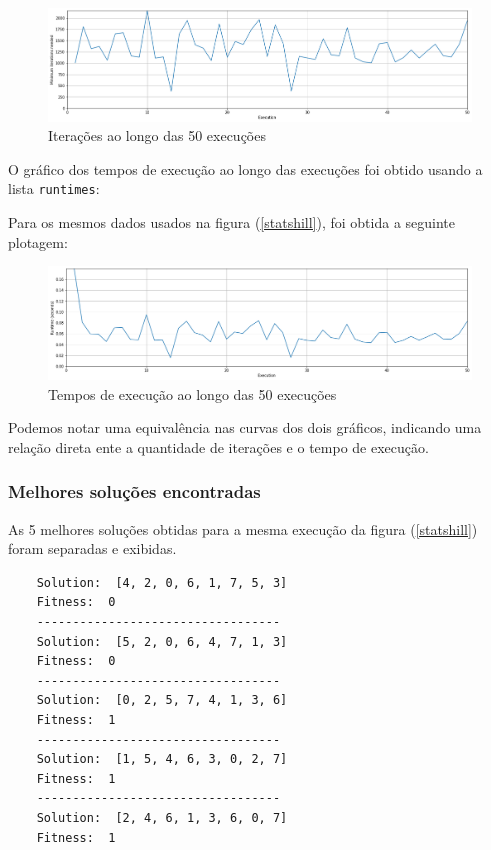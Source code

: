 \begin{figure}[H]
	\centering
	\includegraphics[width=\linewidth]{img/graph_1}
	\caption{Iterações ao longo das 50 execuções}
	\label{hill_iter}
\end{figure}

O gráfico dos tempos de execução ao longo das execuções foi obtido usando a lista \verb*|runtimes|:



Para os mesmos dados usados na figura (\ref{statshill}), foi obtida a seguinte plotagem:

\begin{figure}[H]
	\centering
	\includegraphics[width=\linewidth]{img/graph_2}
	\caption{Tempos de execução ao longo das 50 execuções}
	\label{hill_run}
\end{figure}

Podemos notar uma equivalência nas curvas dos dois gráficos, indicando uma relação direta ente a quantidade de iterações e o tempo de execução.

\subsubsection{Melhores soluções encontradas}

As 5 melhores soluções obtidas para a mesma execução da figura (\ref{statshill}) foram separadas e exibidas.



\begin{verbatim}
	Solution:  [4, 2, 0, 6, 1, 7, 5, 3]
	Fitness:  0
	----------------------------------
	Solution:  [5, 2, 0, 6, 4, 7, 1, 3]
	Fitness:  0
	----------------------------------
	Solution:  [0, 2, 5, 7, 4, 1, 3, 6]
	Fitness:  1
	----------------------------------
	Solution:  [1, 5, 4, 6, 3, 0, 2, 7]
	Fitness:  1
	----------------------------------
	Solution:  [2, 4, 6, 1, 3, 6, 0, 7]
	Fitness:  1
\end{verbatim}